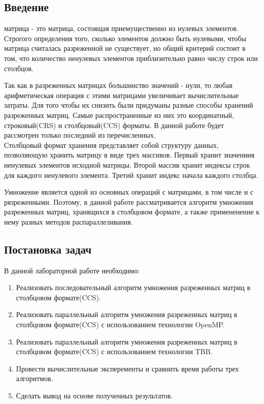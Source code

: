 \documentclass{report}
\begin{document}
\setcounter{page}{2}
\tableofcontents{}
\clearpage

\begin{center}
\section*{Введение}
\end{center}
 матрица - это матрица, состоящая приемущественно из нулевых элементов. Строгого определения того, сколько элементов должно быть нулевыми, чтобы матрица считалась разреженной не существует, но общий критерий состоит в том, что количество ненулевых элементов приблизительно равно числу строк или столбцов.
\par Так как в разреженных матрицах большинство значений - нули, то любая арифметическая операция с этими матрицами увеличивает вычислительные затраты. Для того чтобы их снизить
были придуманы разные способы хранений разреженных матриц. Самые распространенные из них это координатный, строковый(CRS) и столбцовый(CCS) форматы. В данной работе будет рассмотрен только последний из перечисленных.\\
Столбцовый формат хранения представляет собой структуру данных, позволяющую хранить матрицу в виде трех массивов. Первый хранит значениия ненулевых элементов исходной матрицы. Второй массив хранит индексы строк для каждого ненулевого элемента. Третий хранит индекс начала каждого столбца.
\par Умножение является одной из основных операций с матрицами, в том числе и с рязреженными. Поэтому, в данной работе рассматривается алгоритм умножения разреженных матриц, хранящихся в столбцовом формате, а также примененение к нему разных методов распараллеливания.
\newpage

\begin{center}
\section*{Постановка задач}
\end{center}
В данной лабораторной работе необходимо:
\begin{enumerate}
\item Реализовать последовательный алгоритм умножения разреженных матриц в столбцовом формате(CCS).
\item Реализовать параллельный алгоритм умножения разреженных матриц в столбцовом формате(CCS) с использованием технологии OpenMP.
\item Реализовать параллельный алгоритм умножения разреженных матриц в столбцовом формате(CCS) с использованием технологии TBB.
\item Провести вычислительные эксперементы и сравнить время работы трех алгоритмов.
\item Сделать вывод на основе полученных результатов.
\end{enumerate}
\newpage
\end{document}
